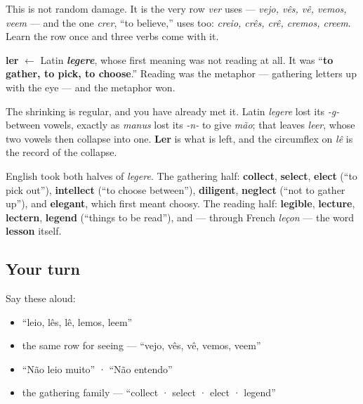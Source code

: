 This is not random damage. It is the very row \emph{ver} uses — \emph{vejo, vês, vê, vemos, veem} — and the one \emph{crer}, \textquotedblleft{}to believe,\textquotedblright{} uses too: \emph{creio, crês, crê, cremos, creem}. Learn the row once and three verbs come with it.

\begin{cousinweb}
\textbf{ler} $\leftarrow$ Latin \emph{\textbf{legere}}, whose first meaning was not reading at all. It was \textquotedblleft{}\textbf{to gather, to pick, to choose}.\textquotedblright{} Reading was the metaphor — gathering letters up with the eye — and the metaphor won.

The shrinking is regular, and you have already met it. Latin \emph{legere} lost its \emph{-g-} between vowels, exactly as \emph{manus} lost its \emph{-n-} to give \emph{mão}; that leaves \emph{leer}, whose two vowels then collapse into one. \textbf{Ler} is what is left, and the circumflex on \emph{lê} is the record of the collapse.

English took both halves of \emph{legere}. The gathering half: \textbf{collect}, \textbf{select}, \textbf{elect} (\textquotedblleft{}to pick out\textquotedblright{}), \textbf{intellect} (\textquotedblleft{}to choose between\textquotedblright{}), \textbf{diligent}, \textbf{neglect} (\textquotedblleft{}not to gather up\textquotedblright{}), and \textbf{elegant}, which first meant choosy. The reading half: \textbf{legible}, \textbf{lecture}, \textbf{lectern}, \textbf{legend} (\textquotedblleft{}things to be read\textquotedblright{}), and — through French \emph{leçon} — the word \textbf{lesson} itself.
\end{cousinweb}

\subsection*{Your turn}
Say these aloud:

\begin{itemize}
\raggedright
  \item \textquotedblleft{}leio, lês, lê, lemos, leem\textquotedblright{}
  \item the same row for seeing — \textquotedblleft{}vejo, vês, vê, vemos, veem\textquotedblright{}
  \item \textquotedblleft{}Não leio muito\textquotedblright{} · \textquotedblleft{}Não entendo\textquotedblright{}
  \item the gathering family — \textquotedblleft{}collect · select · elect · legend\textquotedblright{}
\end{itemize}


